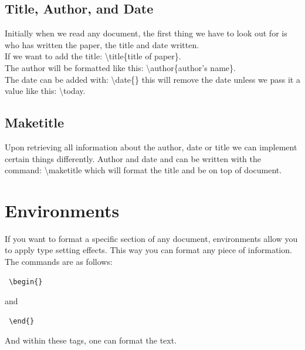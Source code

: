 \documentclass[12pt,journal,compsoc]{IEEEtran}
\begin{document}
\subsection{Title, Author, and Date}
Initially when we read any document, the first thing we have to look out for is who has written the paper, the title and date written.
\\If we want to add the title: \textbackslash title\{title of paper\}. \\The author will be formatted like this: \textbackslash author\{author's name\}. 
\\The date can be added with: \textbackslash date\{\} this will remove the date unless we pass it a value like this: \textbackslash today.

\subsection{Maketitle}
Upon retrieving all information about the author, date or title we can implement certain things differently. Author and date and can be written with the command: \textbackslash maketitle which will format the title and be on top of document.

\section{Environments}

If you want to format a specific section of any document, environments allow you to apply type setting effects. This way you can format any piece of information. The commands are as follows:

\begin{verbatim} \begin{} \end{verbatim} and
\begin{verbatim} \end{} \end{verbatim}
And within these tags, one can format the text.
\end{document}
